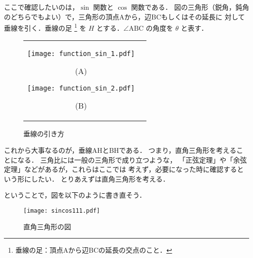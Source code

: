     ここで確認したいのは，$\sin$ 関数と $\cos$ 関数である．
    図の三角形（鋭角，鈍角のどちらでもよい）で，三角形の頂点Aから，辺BCもしくはその延長に
    対して垂線を引く．垂線の足
        \footnote{
            垂線の足：頂点Aから辺BCの延長の交点のこと．
        }
    を $H$ とする．$\angle \mathrm{ABC}$ の角度を $\theta$ と表す．
    \begin{figure}[hbt]
        \begin{tabular}{cc}
            \begin{minipage}{0.5\hsize}
            \begin{center}
                \texttt{[image: function\_sin\_1.pdf]}

                (A)
            \end{center}
            \end{minipage}
            \begin{minipage}{0.5\hsize}
            \begin{center}
                \texttt{[image: function\_sin\_2.pdf]}

                (B)
            \end{center}
            \end{minipage}
        \end{tabular}
        \caption{垂線の引き方}
        \label{fig:suisen_no_hikikata}
    \end{figure}

    これから大事なるのが，垂線AHとBHである．
    つまり，直角三角形を考えることになる．
    三角比には一般の三角形で成り立つような，
    「正弦定理」や「余弦定理」などがあるが，これらはここでは
    考えず，必要になった時に確認するという形にしたい．
    とりあえずは直角三角形を考える．

    ということで，図を以下のように書き直そう．
        \begin{figure}[hbt]
            \begin{center}
                \texttt{[image: sincos111.pdf]}
                \caption{直角三角形の図}
                \label{fig:sincos111}
            \end{center}
        \end{figure}

